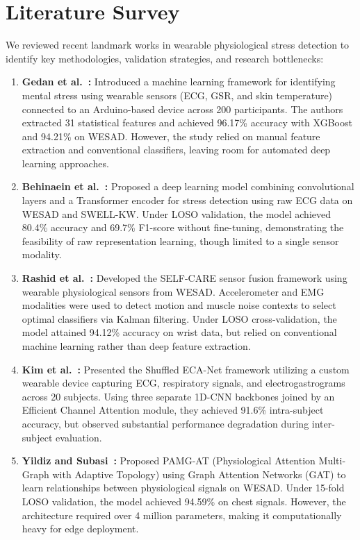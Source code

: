 \documentclass[11pt,a4paper]{article}
\begin{document}
\section{Literature Survey}

We reviewed recent landmark works in wearable physiological stress detection to identify key methodologies, validation strategies, and research bottlenecks:

\begin{enumerate}
    \item \textbf{Gedan et al.~\cite{gedan2021stress}:} Introduced a machine learning framework for identifying mental stress using wearable sensors (ECG, GSR, and skin temperature) connected to an Arduino-based device across 200 participants. The authors extracted 31 statistical features and achieved 96.17\% accuracy with XGBoost and 94.21\% on WESAD. However, the study relied on manual feature extraction and conventional classifiers, leaving room for automated deep learning approaches.
    \item \textbf{Behinaein et al.~\cite{behinaein2021transformer}:} Proposed a deep learning model combining convolutional layers and a Transformer encoder for stress detection using raw ECG data on WESAD and SWELL-KW. Under LOSO validation, the model achieved 80.4\% accuracy and 69.7\% F1-score without fine-tuning, demonstrating the feasibility of raw representation learning, though limited to a single sensor modality.
    \item \textbf{Rashid et al.~\cite{rashid2020selfcare}:} Developed the SELF-CARE sensor fusion framework using wearable physiological sensors from WESAD. Accelerometer and EMG modalities were used to detect motion and muscle noise contexts to select optimal classifiers via Kalman filtering. Under LOSO cross-validation, the model attained 94.12\% accuracy on wrist data, but relied on conventional machine learning rather than deep feature extraction.
    \item \textbf{Kim et al.~\cite{kim2022shuffled}:} Presented the Shuffled ECA-Net framework utilizing a custom wearable device capturing ECG, respiratory signals, and electrogastrograms across 20 subjects. Using three separate 1D-CNN backbones joined by an Efficient Channel Attention module, they achieved 91.6\% intra-subject accuracy, but observed substantial performance degradation during inter-subject evaluation.
    \item \textbf{Yildiz and Subasi~\cite{yildiz2023pamgat}:} Proposed PAMG-AT (Physiological Attention Multi-Graph with Adaptive Topology) using Graph Attention Networks (GAT) to learn relationships between physiological signals on WESAD. Under 15-fold LOSO validation, the model achieved 94.59\% on chest signals. However, the architecture required over 4 million parameters, making it computationally heavy for edge deployment.
\end{enumerate}
\end{document}
